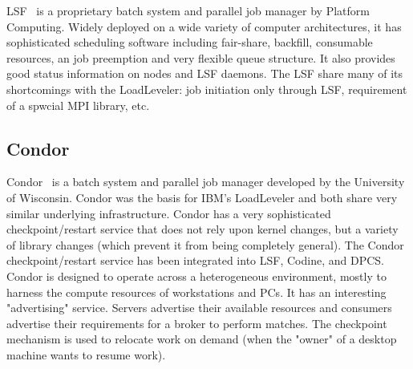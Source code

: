 LSF~\cite{LSF}
is a proprietary batch system and parallel job manager by 
Platform Computing. Widely deployed on a wide variety of computer 
architectures, it has sophisticated scheduling software including 
fair-share, backfill, consumable resources, an job preemption and 
very flexible queue structure.
It also provides good status information on nodes and LSF daemons.
The LSF share many of its shortcomings with the LoadLeveler: job initiation only
through LSF, requirement of a spwcial MPI library, etc.
%


\subsection*{Condor}

Condor~\cite{Condor,Litkow88,Basney97}
is a batch system and parallel job manager 
developed by the University of Wisconsin. 
Condor was the basis for IBM's LoadLeveler and both share very similar 
underlying infrastructure. Condor has a very sophisticated checkpoint/restart 
service that does not rely upon kernel changes, but a variety of 
library changes (which prevent it from being completely general). The 
Condor checkpoint/restart service has been integrated into LSF, 
Codine, and DPCS. Condor is designed to operate across a 
heterogeneous environment, mostly to harness the compute resources of 
workstations and PCs. It has an interesting "advertising" service. 
Servers advertise their available resources and consumers advertise 
their requirements for a broker to perform matches. The checkpoint 
mechanism is used to relocate work on demand (when the "owner" of a 
desktop machine wants to resume work).



